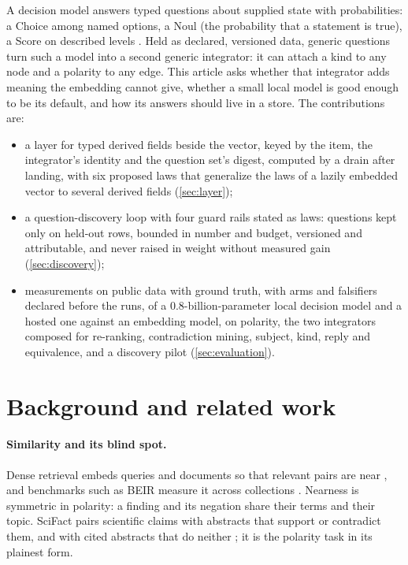 \documentclass[11pt]{article}
\theoremstyle{definition}
\theoremstyle{plain}
\theoremstyle{remark}
\begin{document}
A decision model answers typed questions about supplied state with probabilities: a Choice among
named options, a Noul (the probability that a statement is true), a Score on described levels
\citep{typesafedocs}. Held as declared, versioned data, generic questions turn such a model into
a second generic integrator: it can attach a kind to any node and a polarity to any edge. This
article asks whether that integrator adds meaning the embedding cannot give, whether a small local
model is good enough to be its default, and how its answers should live in a store. The
contributions are:
\begin{itemize}
\item a layer for typed derived fields beside the vector, keyed by the item, the integrator's
  identity and the question set's digest, computed by a drain after landing, with six proposed
  laws that generalize the laws of a lazily embedded vector to several derived fields
  (\cref{sec:layer});
\item a question-discovery loop with four guard rails stated as laws: questions kept only on
  held-out rows, bounded in number and budget, versioned and attributable, and never raised in
  weight without measured gain (\cref{sec:discovery});
\item measurements on public data with ground truth, with arms and falsifiers declared before the
  runs, of a 0.8-billion-parameter local decision model and a hosted one against an embedding
  model, on polarity, the two integrators composed for re-ranking, contradiction mining, subject,
  kind, reply and equivalence, and a discovery pilot (\cref{sec:evaluation}).
\end{itemize}

\section{Background and related work}
\paragraph{Similarity and its blind spot.} Dense retrieval embeds queries and documents so that
relevant pairs are near \citep{reimers2019sbert}, and benchmarks such as BEIR measure it across
collections \citep{thakur2021beir}. Nearness is symmetric in polarity: a finding and its negation
share their terms and their topic. SciFact pairs scientific claims with abstracts that support or
contradict them, and with cited abstracts that do neither \citep{wadden2020scifact}; it is the
polarity task in its plainest form.
\end{document}
